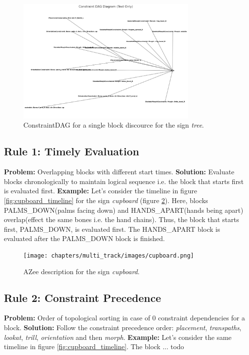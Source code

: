 \documentclass[../../main.tex]{subfiles}
\begin{document}
\begin{figure}[h]
    \centering
    \includegraphics[width=0.8\textwidth]{chapters/multi_track/images/constraint_dag.png}
    \caption{ConstraintDAG for a single block discource for the sign \emph{tree}.}
    \label{fig:constraint_dag}
\end{figure}

\subsection{Rule 1: Timely Evaluation}
\label{ch:multi_track:resolve_conflitcs:rule1}
\textbf{Problem:} Overlapping blocks with different start times.
\textbf{Solution:} Evaluate blocks chronologically to maintain logical sequence i.e. the block that starts first is evaluated first.
\textbf{Example:} Let's consider the timeline in figure \ref{fig:cupboard_timeline} for the sign \emph{cupboard} (figure \ref{fig:cupboard}). Here, blocks PALMS_DOWN(palms facing down) and HANDS_APART(hands being apart) overlap(effect the same bones i.e. the hand chains). Thus, the block that starts first, PALMS_DOWN, is evaluated first. The HANDS_APART block is evaluated after the PALMS_DOWN block is finished.

\begin{figure}
    \centering
    \texttt{[image: chapters/multi\_track/images/cupboard.png]}
    \caption{AZee description for the sign \emph{cupboard}.}
    \label{fig:cupboard}
\end{figure}

\subsection{Rule 2: Constraint Precedence}
\label{ch:multi_track:resolve_conflitcs:rule2}
\textbf{Problem:} Order of topological sorting in case of 0 constraint dependencies for a block.
\textbf{Solution:} Follow the constraint precedence order: \emph{placement}, \emph{transpaths}, \emph{lookat}, \emph{trill}, \emph{orientation} and then \emph{morph}.
\textbf{Example:} Let's consider the same timeline in figure \ref{fig:cupboard_timeline}. The block ... todo
\end{document}
